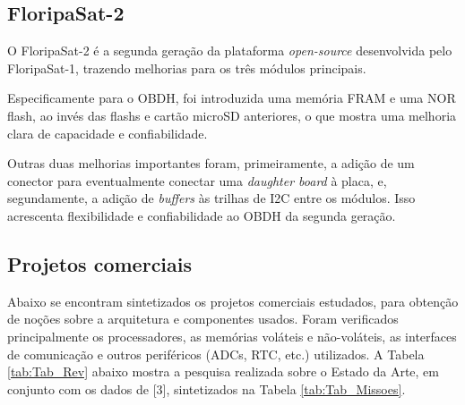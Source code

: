 \subsection{FloripaSat-2}
O FloripaSat-2 é a segunda geração da plataforma \textit{open-source} desenvolvida pelo FloripaSat-1, trazendo melhorias para os três módulos principais.

Especificamente para o OBDH, foi introduzida uma memória FRAM e uma NOR flash, ao invés das flashs e cartão microSD anteriores, o que mostra uma melhoria clara de capacidade e confiabilidade. 

Outras duas melhorias importantes foram, primeiramente, a adição de um conector para eventualmente conectar uma \textit{daughter board} à placa, e, segundamente, a adição de \textit{buffers} às trilhas de I2C entre os módulos. Isso acrescenta flexibilidade e confiabilidade ao OBDH da segunda geração.

\subsection{Projetos comerciais}

Abaixo se encontram sintetizados os projetos comerciais estudados, para obtenção de noções sobre a arquitetura e componentes usados. Foram verificados principalmente os processadores, as memórias voláteis e não-voláteis, as interfaces de comunicação e outros periféricos (ADCs, RTC, etc.) utilizados. A Tabela \ref{tab:Tab_Rev} abaixo mostra a pesquisa realizada sobre o Estado da Arte, em conjunto com os dados de [3], sintetizados na Tabela \ref{tab:Tab_Missoes}.

